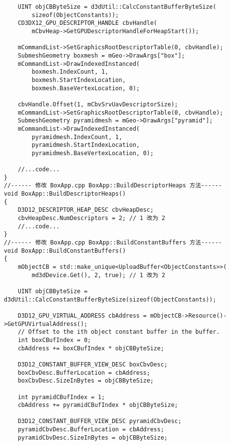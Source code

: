 \begin{lstlisting}
    UINT objCBByteSize = d3dUtil::CalcConstantBufferByteSize(
        sizeof(ObjectConstants));
    CD3DX12_GPU_DESCRIPTOR_HANDLE cbvHandle(
        mCbvHeap->GetGPUDescriptorHandleForHeapStart());

    mCommandList->SetGraphicsRootDescriptorTable(0, cbvHandle);
    SubmeshGeometry boxmesh = mGeo->DrawArgs["box"];
    mCommandList->DrawIndexedInstanced(
        boxmesh.IndexCount, 1,
        boxmesh.StartIndexLocation,
        boxmesh.BaseVertexLocation, 0);

    cbvHandle.Offset(1, mCbvSrvUavDescriptorSize);
    mCommandList->SetGraphicsRootDescriptorTable(0, cbvHandle);
    SubmeshGeometry pyramidmesh = mGeo->DrawArgs["pyramid"];
    mCommandList->DrawIndexedInstanced(
        pyramidmesh.IndexCount, 1,
        pyramidmesh.StartIndexLocation, 
        pyramidmesh.BaseVertexLocation, 0);

    //...code...
}
//------ 修改 BoxApp.cpp BoxApp::BuildDescriptorHeaps 方法------
void BoxApp::BuildDescriptorHeaps()
{
    D3D12_DESCRIPTOR_HEAP_DESC cbvHeapDesc;
    cbvHeapDesc.NumDescriptors = 2; // 1 改为 2
    //...code...
}
//------ 修改 BoxApp.cpp BoxApp::BuildConstantBuffers 方法------
void BoxApp::BuildConstantBuffers()
{
    mObjectCB = std::make_unique<UploadBuffer<ObjectConstants>>(
        md3dDevice.Get(), 2, true); // 1 改为 2

    UINT objCBByteSize = d3dUtil::CalcConstantBufferByteSize(sizeof(ObjectConstants));

    D3D12_GPU_VIRTUAL_ADDRESS cbAddress = mObjectCB->Resource()->GetGPUVirtualAddress();
    // Offset to the ith object constant buffer in the buffer.
    int boxCBufIndex = 0;
    cbAddress += boxCBufIndex * objCBByteSize;

    D3D12_CONSTANT_BUFFER_VIEW_DESC boxCbvDesc;
    boxCbvDesc.BufferLocation = cbAddress;
    boxCbvDesc.SizeInBytes = objCBByteSize;

    int pyramidCBufIndex = 1;
    cbAddress += pyramidCBufIndex * objCBByteSize;

    D3D12_CONSTANT_BUFFER_VIEW_DESC pyramidCbvDesc;
    pyramidCbvDesc.BufferLocation = cbAddress;
    pyramidCbvDesc.SizeInBytes = objCBByteSize;


\end{lstlisting}
